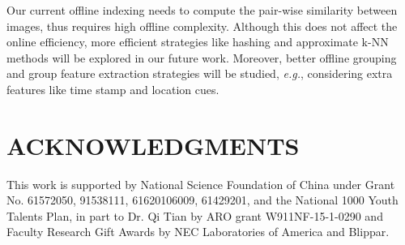 \documentclass[sigconf]{acmart}
\begin{document}
Our current offline indexing needs to compute the pair-wise similarity between images, thus requires high offline complexity. Although this does not affect the online efficiency, more efficient strategies like hashing and approximate k-NN methods will be explored in our future work. Moreover, better offline grouping and group feature extraction strategies will be studied, \emph{e.g.}, considering extra features like time stamp and location cues.

\section*{ACKNOWLEDGMENTS}
This work is supported by National Science Foundation of China under Grant No. 61572050, 91538111, 61620106009, 61429201, and the National 1000 Youth Talents Plan, in part to Dr. Qi Tian by ARO grant W911NF-15-1-0290 and Faculty Research Gift Awards by NEC Laboratories of America and Blippar.
\newpage


\balance

\end{document}
